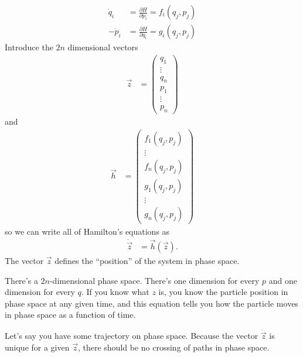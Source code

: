 \begin{align}
    \dot{q}_i &= \frac{\partial H}{\partial p_i} = f_i(q_j, p_j)\\
    -\dot{p}_i &= \frac{\partial H}{\partial q_i} = g_i(q_j, p_j)
\end{align}
Introduce the $2n$ dimensional vectors
\begin{align}
    \vec{z} &=
    \begin{pmatrix}
        q_1\\
        \vdots\\
        q_n\\
        p_1\\
        \vdots\\
        p_n
    \end{pmatrix}
\end{align}
and
\begin{align}
    \vec{h} &=
    \begin{pmatrix}
        f_1(q_j, p_j)\\
        \vdots\\
        f_n(q_j, p_j)\\
        g_1(q_j, p_j)\\
        \vdots\\
        g_n(q_j, p_j)
    \end{pmatrix}
\end{align}
so we can write all of Hamilton's equations as
\begin{align}
    \dot{\vec{z}} &= \vec{h}(\vec{z}).
\end{align}
The vector $\vec{z}$ defines the ``position'' of the system in phase space.

There's a $2n$-dimensional phase space.
There's one dimension for every $p$ and one dimension for every $q$.
If you know what $z$ is,
you know the particle position in phase space at any given time,
and this equation tells you how the particle moves in phase space as a function
of time.

Let's say you have some trajectory on phase space.
Because the vector $\dot{\vec{z}}$ is unique for a given $\vec{z}$,
there should be no crossing of paths in phase space.

